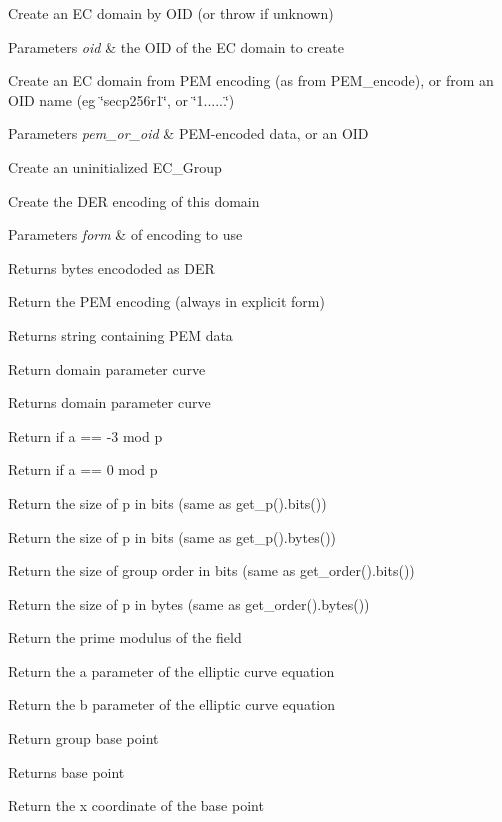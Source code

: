 Create an EC domain by O\+ID (or throw if unknown) 
\begin{DoxyParams}{Parameters}
{\em oid} & the O\+ID of the EC domain to create\\
\hline
\end{DoxyParams}
Create an EC domain from P\+EM encoding (as from P\+E\+M\+\_\+encode), or from an O\+ID name (eg \char`\"{}secp256r1\char`\"{}, or \char`\"{}1......\char`\"{}) 
\begin{DoxyParams}{Parameters}
{\em pem\+\_\+or\+\_\+oid} & P\+E\+M-\/encoded data, or an O\+ID\\
\hline
\end{DoxyParams}
Create an uninitialized E\+C\+\_\+\+Group

Create the D\+ER encoding of this domain 
\begin{DoxyParams}{Parameters}
{\em form} & of encoding to use \\
\hline
\end{DoxyParams}
\begin{DoxyReturn}{Returns}
bytes encododed as D\+ER
\end{DoxyReturn}
Return the P\+EM encoding (always in explicit form) \begin{DoxyReturn}{Returns}
string containing P\+EM data
\end{DoxyReturn}
Return domain parameter curve \begin{DoxyReturn}{Returns}
domain parameter curve
\end{DoxyReturn}
Return if a == -\/3 mod p

Return if a == 0 mod p

Return the size of p in bits (same as get\+\_\+p().bits())

Return the size of p in bits (same as get\+\_\+p().bytes())

Return the size of group order in bits (same as get\+\_\+order().bits())

Return the size of p in bytes (same as get\+\_\+order().bytes())

Return the prime modulus of the field

Return the a parameter of the elliptic curve equation

Return the b parameter of the elliptic curve equation

Return group base point \begin{DoxyReturn}{Returns}
base point
\end{DoxyReturn}
Return the x coordinate of the base point


